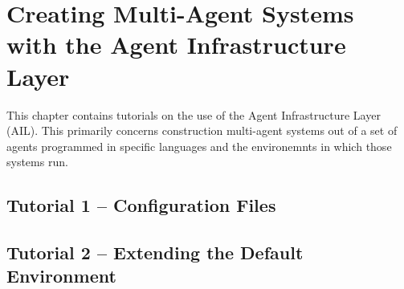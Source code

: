 %

\chapter{Creating Multi-Agent Systems with the Agent Infrastructure Layer}

This chapter contains tutorials on the use of the Agent Infrastructure Layer (AIL).  This primarily concerns construction multi-agent systems out of a set of agents programmed in specific languages and the environemnts in which those systems run.

\section{Tutorial 1 -- Configuration Files}

{
  \let\section\subsection
  \let\subsection\subsubsection
  \let\subsubsection\paragraph
  
  
  }

\section{Tutorial 2 -- Extending the Default Environment}

